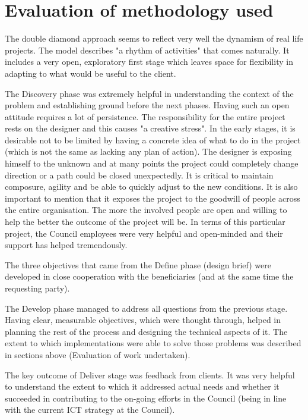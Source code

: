 	\section{Evaluation of methodology used}

The double diamond approach seems to reflect very well the dynamism of real life projects. The model describes "a rhythm of activities" that comes naturally. It includes a very open, exploratory first stage which leaves space for flexibility in adapting to what would be useful to the client.

The Discovery phase was extremely helpful in understanding the context of the problem and establishing ground before the next phases. Having such an open attitude requires a lot of persistence. The responsibility for the entire project rests on the designer and this causes "a creative stress". In the early stages, it is desirable not to be limited by having a concrete idea of what to do in the project (which is not the same as lacking any plan of action). The designer is exposing himself to the unknown and at many points the project could completely change direction or a path could be closed unexpectedly. It is critical to maintain composure, agility and be able to quickly adjust to the new conditions. It is also important to mention that it exposes the project to the goodwill of people across the entire organisation. The more the involved people are open and willing to help the better the outcome of the project will be. In terms of this particular project, the Council employees were very helpful and open-minded and their support has helped tremendously.

The three objectives that came from the Define phase (design brief) were developed in close cooperation with the beneficiaries (and at the same time the requesting party).

The Develop phase managed to address all questions from the previous stage. Having clear, measurable objectives, which were thought through, helped in planning the rest of the process and designing the technical aspects of it. The extent to which implementations were able to solve those problems was described in sections above (Evaluation of work undertaken).

The key outcome of Deliver stage was feedback from clients. It was very helpful to understand the extent to which it addressed actual needs and whether it succeeded in contributing to the on-going efforts in the Council (being in line with the current ICT strategy at the Council).